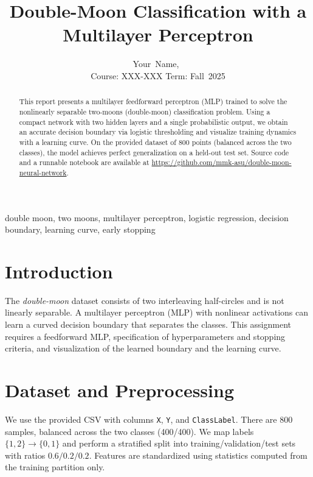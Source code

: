 \documentclass[journal]{IEEEtran}
\begin{document}
\title{Double-Moon Classification with a Multilayer Perceptron}

\author{%
Your~Name,~\\
Course: XXX-XXX \quad Term: Fall~2025
}

\maketitle

\begin{abstract}
This report presents a multilayer feedforward perceptron (MLP) trained to solve the nonlinearly separable two-moons (double-moon) classification problem. Using a compact network with two hidden layers and a single probabilistic output, we obtain an accurate decision boundary via logistic thresholding and visualize training dynamics with a learning curve. On the provided dataset of 800 points (balanced across the two classes), the model achieves perfect generalization on a held-out test set. Source code and a runnable notebook are available at \url{https://github.com/mmk-asu/double-moon-neural-network}.
\end{abstract}

\begin{IEEEkeywords}
double moon, two moons, multilayer perceptron, logistic regression, decision boundary, learning curve, early stopping
\end{IEEEkeywords}

\section{Introduction}
The \emph{double-moon} dataset consists of two interleaving half-circles and is not linearly separable. A multilayer perceptron (MLP) with nonlinear activations can learn a curved decision boundary that separates the classes. This assignment requires a feedforward MLP, specification of hyperparameters and stopping criteria, and visualization of the learned boundary and the learning curve.

\section{Dataset and Preprocessing}
We use the provided CSV with columns \texttt{X}, \texttt{Y}, and \texttt{ClassLabel}. There are 800 samples, balanced across the two classes (400/400). We map labels $\{1,2\}\!\to\!\{0,1\}$ and perform a stratified split into training/validation/test sets with ratios $0.6/0.2/0.2$. Features are standardized using statistics computed from the training partition only.
\end{document}
